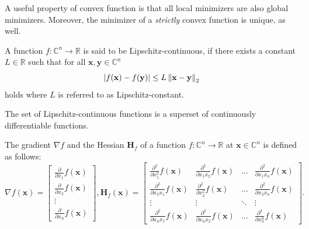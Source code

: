 \begin{tight_equations}
\begin{remark}
A useful property of convex function is that all local minimizers are also global minimizers. Moreover, the minimizer of a \textit{strictly} convex function is unique, as well.
\end{remark}

\begin{definition}
A function $f:\mathbb{C}^n \rightarrow \mathbb{R}$ is said to be Lipschitz-continuous, if there exists a constant $L \in \mathbb{R}$ such that for all $\mathbf{x}, \mathbf{y} \in \mathbb{C}^n$
\[|f(\mathbf{x}) - f(\mathbf{y})| \le L \left\lVert\mathbf{x} - \mathbf{y}\right\rVert_2\]
holds where $L$ is referred to as Lipschitz-constant.
\end{definition}

\begin{remark}
The set of Lipschitz-continuous functions is a superset of continuously differentiable functions.
\end{remark}

\begin{definition}
The gradient $\nabla f$ and the Hessian $\mathbf{H}_f$ of a function $f:\mathbb{C}^n \rightarrow \mathbb{R}$ at $\mathbf{x} \in \mathbb{C}^n$ is defined as follows:
\[\nabla f(\mathbf{x}) = \begin{bmatrix}
\frac{\partial}{\partial x_1} f(\mathbf{x}) \\ 
\frac{\partial}{\partial x_2} f(\mathbf{x}) \\ 
\vdots \\ 
\frac{\partial}{\partial x_n} f(\mathbf{x})
\end{bmatrix}, \mathbf{H}_f(\mathbf{x}) = \begin{bmatrix}
\frac{\partial^2}{\partial x_1^2} f(\mathbf{x}) & \frac{\partial^2}{\partial x_1 x_2} f(\mathbf{x}) & \ldots & \frac{\partial^2}{\partial x_1 x_n} f(\mathbf{x}) \\ 
\frac{\partial^2}{\partial x_2 x_1} f(\mathbf{x}) & \frac{\partial^2}{\partial x_2^2} f(\mathbf{x}) & \ldots & \frac{\partial^2}{\partial x_2 x_n} f(\mathbf{x}) \\ 
\vdots & \vdots & \ddots & \vdots \\ 
\frac{\partial^2}{\partial x_n x_1} f(\mathbf{x}) & \frac{\partial^2}{\partial x_n x_2} f(\mathbf{x}) & \ldots & \frac{\partial^2}{\partial x_n^n} f(\mathbf{x})
\end{bmatrix}.\]
\end{definition}


\end{tight_equations}
